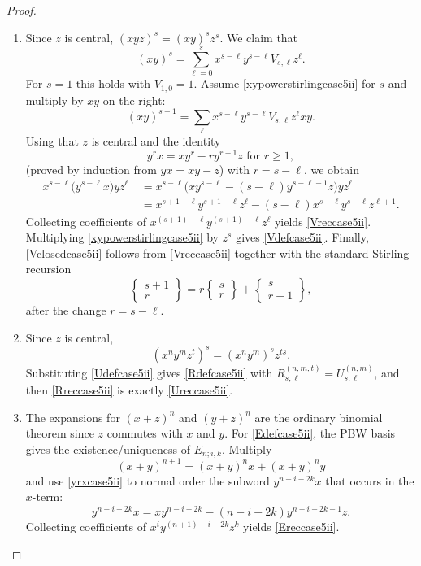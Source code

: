 \documentclass{amsart}
\theoremstyle{definition}
\theoremstyle{remark}
\numberwithin{equation}{section}
\begin{document}
\begin{proof}
\begin{enumerate}
\item [\rm (3)] Since $z$ is central, $\left(xyz\right)^s = (xy)^s z^s$. We claim that
\begin{equation}\label{xypowerstirlingcase5ii}
(xy)^s=\sum_{\ell=0}^{s}x^{s-\ell}y^{s-\ell} V_{s,\ell} z^{\ell}.
\end{equation}
For $s=1$ this holds with $V_{1,0}=1$. Assume \eqref{xypowerstirlingcase5ii} for $s$ and multiply by $xy$ on the right:
\[
(xy)^{s+1}=\sum_{\ell}x^{s-\ell}y^{s-\ell}V_{s,\ell} z^\ell xy.
\]
Using that $z$ is central and the identity 
\begin{equation}\label{yrxcase5ii}
y^{r}x=x y^{r}-r y^{r-1}z \text{ for } r\ge 1,
\end{equation}
(proved by induction from $yx=xy-z$) with $r=s-\ell$, we obtain 
\begin{align*}
x^{s-\ell}\big(y^{s-\ell}x\big)y z^\ell
 &\ =x^{s-\ell}\big(xy^{s-\ell}-(s-\ell)y^{s-\ell-1}z\big)y z^\ell \\
&\ =x^{s+1-\ell}y^{s+1-\ell}z^\ell-(s-\ell)x^{s-\ell}y^{s-\ell}z^{\ell+1}.
\end{align*}
Collecting coefficients of $x^{(s+1)-\ell}y^{(s+1)-\ell}z^\ell$ yields \eqref{Vreccase5ii}.
Multiplying \eqref{xypowerstirlingcase5ii} by $z^s$ gives \eqref{Vdefcase5ii}.
Finally, \eqref{Vclosedcase5ii} follows from \eqref{Vreccase5ii} together with the standard Stirling recursion
$$
\left\{\begin{matrix}s+1\\r\end{matrix}\right\}
=r\left\{\begin{matrix}s\\r\end{matrix}\right\}
+\left\{\begin{matrix}s\\r-1\end{matrix}\right\}, 
$$ 
after the change $r = s-\ell$.

\item [\rm (4)] Since $z$ is central,
\[
(x^n y^m z^t)^s=(x^n y^m)^s z^{ts}.
\]
Substituting \eqref{Udefcase5ii} gives \eqref{Rdefcase5ii} with $R^{(n,m,t)}_{s,\ell}=U^{(n,m)}_{s,\ell}$, and then \eqref{Rreccase5ii} is exactly \eqref{Ureccase5ii}.

\item [\rm (5)] The expansions for $(x+z)^n$ and $(y+z)^n$ are the ordinary binomial theorem since $z$ commutes with $x$ and $y$. For \eqref{Edefcase5ii}, the PBW basis gives the existence/uniqueness of $E_{n;i,k}$. Multiply
\[
(x+y)^{n+1}=(x+y)^n x+(x+y)^n y
\]
and use \eqref{yrxcase5ii} to normal order the subword $y^{n-i-2k}x$ that occurs in the $x$-term:
\[
y^{n-i-2k}x=x y^{n-i-2k}-(n-i-2k) y^{n-i-2k-1}z.
\]
Collecting coefficients of $x^i y^{(n+1)-i-2k}z^k$ yields \eqref{Ereccase5ii}.
\end{enumerate}
\end{proof}
\end{document}
